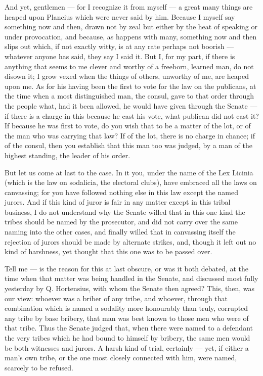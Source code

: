  And yet, gentlemen --- for I recognize it from myself --- a great many things are heaped upon Plancius which were never said by him. Because I myself say something now and then, drawn not by zeal but either by the heat of speaking or under provocation, and because, as happens with many, something now and then slips out which, if not exactly witty, is at any rate perhaps not boorish --- whatever anyone has said, they say I said it. But I, for my part, if there is anything that seems to me clever and worthy of a freeborn, learned man, do not disown it; I grow vexed when the things of others, unworthy of me, are heaped upon me. As for his having been the first to vote for the law on the publicans, at the time when a most distinguished man, the consul, gave to that order through the people what, had it been allowed, he would have given through the Senate --- if there is a charge in this because he cast his vote, what publican did not cast it? If because he was first to vote, do you wish that to be a matter of the lot, or of the man who was carrying that law? If of the lot, there is no charge in chance; if of the consul, then you establish that this man too was judged, by a man of the highest standing, the leader of his order.

 But let us come at last to the case. In it you, under the name of the Lex Licinia (which is the law on sodalicia, the electoral clubs), have embraced all the laws on canvassing; for you have followed nothing else in this law except the named jurors. And if this kind of juror is fair in any matter except in this tribal business, I do not understand why the Senate willed that in this one kind the tribes should be named by the prosecutor, and did not carry over the same naming into the other cases, and finally willed that in canvassing itself the rejection of jurors should be made by alternate strikes, and, though it left out no kind of harshness, yet thought that this one was to be passed over.

 Tell me --- is the reason for this at last obscure, or was it both debated, at the time when that matter was being handled in the Senate, and discussed most fully yesterday by Q. Hortensius, with whom the Senate then agreed? This, then, was our view: whoever was a briber of any tribe, and whoever, through that combination which is named a sodality more honourably than truly, corrupted any tribe by base bribery, that man was best known to those men who were of that tribe. Thus the Senate judged that, when there were named to a defendant the very tribes which he had bound to himself by bribery, the same men would be both witnesses and jurors. A harsh kind of trial, certainly --- yet, if either a man's own tribe, or the one most closely connected with him, were named, scarcely to be refused.

